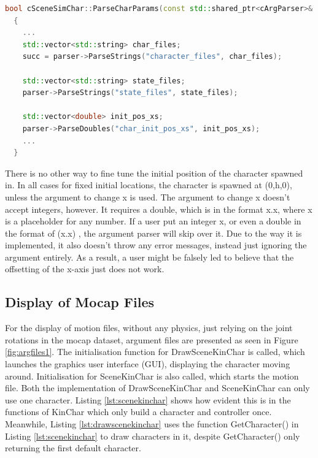 \documentclass{l4proj}
\begin{document}
\begin{lstlisting}[language=C++, float, caption={The function that parses the arguments for characters}, label=lst:parsecharparams]
  bool cSceneSimChar::ParseCharParams(const std::shared_ptr<cArgParser>& parser, cSimCharacter::tParams& out_params) const
  {
    ...
    std::vector<std::string> char_files;
    succ = parser->ParseStrings("character_files", char_files);

    std::vector<std::string> state_files;
    parser->ParseStrings("state_files", state_files);

    std::vector<double> init_pos_xs;
    parser->ParseDoubles("char_init_pos_xs", init_pos_xs);
    ...
  }
\end{lstlisting}

There is no other way to fine tune the initial position of the character spawned in. In all cases for fixed initial locations, the character is spawned at (0,h,0), unless the argument to change x is used. The argument to change x doesn't accept integers, however. It requires a double, which is in the format x.x, where x is a placeholder for any number. If a user put an integer x, or even a double in the format of (x.x) , the argument parser will skip over it. Due to the way it is implemented, it also doesn't throw any error messages, instead just ignoring the argument entirely. As a result, a user might be falsely led to believe that the offsetting of the x-axis just does not work.

\subsection{Display of Mocap Files}
For the display of motion files, without any physics, just relying on the joint rotations in the mocap dataset, argument files are presented as seen in Figure \ref{fig:argfiles1}. The initialisation function for DrawSceneKinChar is called, which launches the graphics user interface (GUI), displaying the character moving around. Initialisation for SceneKinChar is also called, which starts the motion file. Both the implementation of DrawSceneKinChar and SceneKinChar can only use one character. Listing \ref{lst:scenekinchar} shows how evident this is in the functions of KinChar which only build a character and controller once. Meanwhile, Listing \ref{lst:drawscenekinchar} uses the function GetCharacter() in Listing \ref{lst:scenekinchar} to draw characters in it, despite GetCharacter() only returning the first default character.
\end{document}
